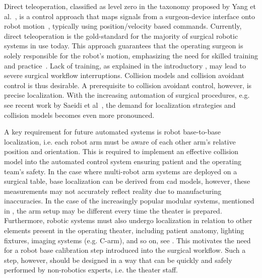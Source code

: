 Direct teleoperation, classified as level zero in the taxonomy proposed by Yang et al.~\cite{zhang2017automation}, is a control approach that maps signals from a surgeon-device interface onto robot motion~\cite{Niemeyer2008}, typically using position/velocity based commands.
Currently, direct teleoperation is the gold-standard for the majority of surgical robotic systems in use today. This approach guarantees that the operating surgeon is solely responsible for the robot's motion, emphasizing the need for skilled training and practice~\cite{Liu15}. Lack of training, as explained in the introductory , may lead to severe surgical workflow interruptions. Collision models and collision avoidant control is thus desirable. A prerequisite to collision avoidant control, however, is precise localization. With the increasing automation of surgical procedures, e.g. see recent work by Saeidi et al~\cite{Saeidi2022}, the demand for localization strategies and collision models becomes even more pronounced.


A key requirement for future automated systems is robot base-to-base localization, i.e. each robot arm must be aware of each other arm's relative position and orientation. This is required to implement an effective collision model into the automated control system ensuring patient and the operating team's safety. In the case where multi-robot arm systems are deployed on a surgical table, base localization can be derived from \gls{cad} models, however, these measurements may not accurately reflect reality due to manufacturing inaccuracies. In the case of the increasingly popular modular systems, mentioned in , the arm setup may be different every time the theater is prepared. Furthermore, robotic systems must also undergo localization in relation to other elements present in the operating theater, including patient anatomy, lighting fixtures, imaging systems (e.g. C-arm), and so on, see . This motivates the need for a robot base calibration step introduced into the surgical workflow. Such a step, however, should be designed in a way that can be quickly and safely performed by non-robotics experts, i.e. the theater staff.



